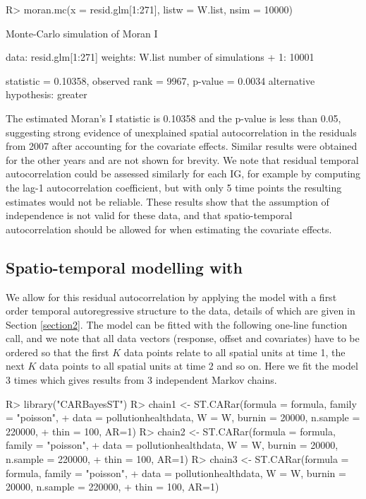 \documentclass[article, nojss]{jss}
\begin{document}
\begin{Schunk}
\begin{Sinput}
R>  moran.mc(x = resid.glm[1:271], listw = W.list, nsim = 10000)
\end{Sinput}
\begin{Soutput}
	Monte-Carlo simulation of Moran I

data:  resid.glm[1:271] 
weights: W.list  
number of simulations + 1: 10001 

statistic = 0.10358, observed rank = 9967, p-value = 0.0034
alternative hypothesis: greater
\end{Soutput}
\end{Schunk}

The estimated Moran's I statistic is 0.10358 and the p-value is less than 0.05, suggesting strong evidence of unexplained spatial autocorrelation in the residuals from 2007 after accounting for the covariate effects. Similar results were obtained for the other years and are not shown for brevity. We note that residual temporal autocorrelation could be assessed similarly for each IG, for example by computing the lag-1 autocorrelation coefficient, but with only 5 time points the resulting estimates would not be reliable. These results show that the assumption of independence is not valid for these data, and that spatio-temporal autocorrelation should be allowed for when estimating the covariate effects. 


\subsection[Spatio-temporal modelling with CARBayesST]{Spatio-temporal modelling with }
We allow for this residual autocorrelation by applying the  model with a first order temporal autoregressive structure to the data, details of which are given in Section \ref{section2}. The model can be fitted with the following one-line function call, and we note that all data vectors (response, offset and covariates) have to be ordered so that the first $K$ data points relate to all spatial units at time 1, the next $K$ data points to all spatial units at time 2 and so on. Here we fit the model 3 times which gives results from 3 independent Markov chains.


\begin{CodeInput}
R>  library("CARBayesST")
R>  chain1 <- ST.CARar(formula = formula, family = "poisson", 
+       data = pollutionhealthdata, W = W, burnin = 20000, n.sample = 220000, 
+       thin = 100, AR=1)
R>  chain2 <- ST.CARar(formula = formula, family = "poisson", 
+       data = pollutionhealthdata, W = W, burnin = 20000, n.sample = 220000, 
+       thin = 100, AR=1)
R>  chain3 <- ST.CARar(formula = formula, family = "poisson", 
+       data = pollutionhealthdata, W = W, burnin = 20000, n.sample = 220000, 
+       thin = 100, AR=1)
\end{CodeInput}
\end{document}
